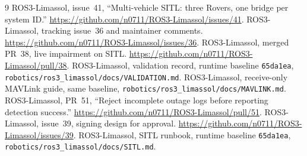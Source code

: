\documentclass[10pt,a4paper]{article}
\begin{document}
\begin{thebibliography}{9}
\small
{} ROS3-Limassol, issue~41, ``Multi-vehicle SITL: three Rovers,
one bridge per system ID.'' \url{https://github.com/n0711/ROS3-Limassol/issues/41}.
 ROS3-Limassol, tracking issue~36 and maintainer comments.
\url{https://github.com/n0711/ROS3-Limassol/issues/36}.
 ROS3-Limassol, merged PR~38, live impairment on SITL.
\url{https://github.com/n0711/ROS3-Limassol/pull/38}.
 ROS3-Limassol, validation record, runtime baseline
\texttt{65da1ea}, \texttt{robotics/ros3\_limassol/docs/VALIDATION.md}.
 ROS3-Limassol, receive-only MAVLink guide, same baseline,
\texttt{robotics/ros3\_limassol/docs/MAVLINK.md}.
 ROS3-Limassol, PR~51, ``Reject incomplete outage logs before
reporting detection success.'' \url{https://github.com/n0711/ROS3-Limassol/pull/51}.
 ROS3-Limassol, issue~39, signing design for approval.
\url{https://github.com/n0711/ROS3-Limassol/issues/39}.
 ROS3-Limassol, SITL runbook, runtime baseline
\texttt{65da1ea}, \texttt{robotics/ros3\_limassol/docs/SITL.md}.
\end{thebibliography}
\end{document}
